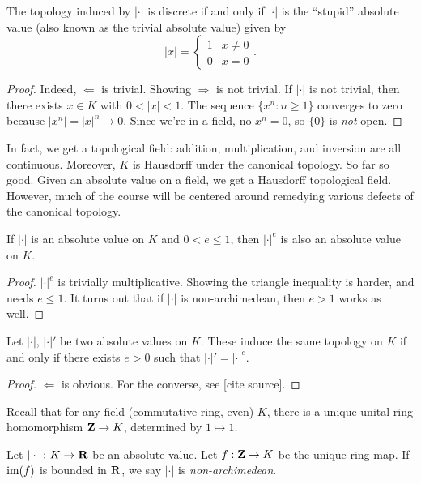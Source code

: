 \begin{lemma}
The topology induced by $|\cdot|$ is discrete if and only if $|\cdot|$ is 
the ``stupid'' absolute value (also known as the trivial absolute value) 
given by 
\[
  |x|=\begin{cases} 1 & x\ne 0 \\ 0 & x=0 \end{cases} .
\]
\end{lemma}
\begin{proof}
Indeed, $\Leftarrow$ is trivial. Showing $\Rightarrow$ is not trivial. If 
$|\cdot|$ is not trivial, then there exists $x\in K$ with 
$0<|x|<1$. The sequence $\{x^n:n\geqslant 1\}$ converges to zero because 
$|x^n|=|x|^n\to 0$. Since we're in a field, no $x^n=0$, so $\{0\}$ is 
\emph{not} open. 
\end{proof}

In fact, we get a topological field: addition, multiplication, and inversion 
are all continuous. Moreover, $K$ is Hausdorff under the canonical topology. 
So far so good. Given an absolute value on a field, we get a Hausdorff topological 
field. However, much of the course will be centered around remedying various 
defects of the canonical topology. 

\begin{lemma}
If $|\cdot|$ is an absolute value on $K$ and $0<e\leqslant 1$, then 
$|\cdot|^e$ is also an absolute value on $K$. 
\end{lemma}
\begin{proof}
$|\cdot|^e$ is trivially multiplicative. Showing the triangle inequality 
is harder, and needs $e\leqslant 1$. It turns out that if $|\cdot|$ is 
non-archimedean, then $e>1$ works as well. 
\end{proof}

\begin{theorem}\label{thm:field-equiv-abs}
Let $|\cdot|$, $|\cdot|'$ be two absolute values on $K$. These induce the 
same topology on $K$ if and only if there exists $e>0$ such that 
$|\cdot|'=|\cdot|^e$. 
\end{theorem}
\begin{proof}
$\Leftarrow$ is obvious. For the converse, see [cite source]. 
\end{proof}

Recall that for any field (commutative ring, even) $K$, there is a unique 
unital ring homomorphism $\mathbf{Z}\to K$, determined by $1\mapsto 1$. 

\begin{definition}
Let $|\cdot|\colon K\to \mathbf{R}$ be an absolute value. Let $f:\mathbf{Z}\to K$ be the 
unique ring map. If $\operatorname{im}(f)$ is bounded in $\mathbf{R}$, we say $|\cdot|$ is 
\emph{non-archimedean}. 
\end{definition}

